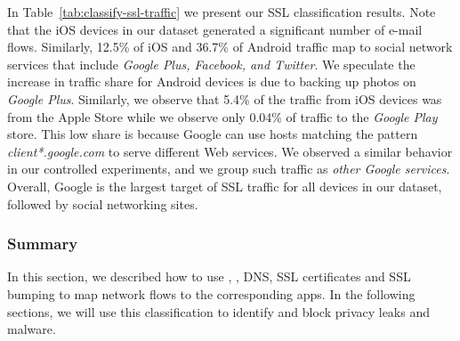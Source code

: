 In Table~\ref{tab:classify-ssl-traffic} we present our SSL classification results.
Note that the iOS devices in our dataset generated a significant number of e-mail flows.
Similarly, 12.5\% of iOS and 36.7\% of Android traffic map to social network services that include \emph{Google Plus, Facebook, and Twitter}.
We speculate the increase in traffic share for Android devices is due to backing up photos on \emph{Google Plus}.
Similarly, we observe that 5.4\% of the traffic from iOS devices was from the Apple Store while we observe only 0.04\% of traffic to the \emph{Google Play} store. 
This low share is because Google can use hosts matching the pattern \emph{client*.google.com} to serve different Web services.
We observed a similar behavior in our controlled experiments, and we group such traffic as \emph{other Google services}. Overall, 
Google is the largest target of SSL traffic for all devices in our dataset, followed by social networking sites.

\subsubsection{Summary}
In this section, we described how to use \useragent, \httphost, DNS, SSL certificates and SSL bumping to map 
network flows to the corresponding apps. In the following sections, we will use this classification to identify and 
block privacy leaks and malware.



